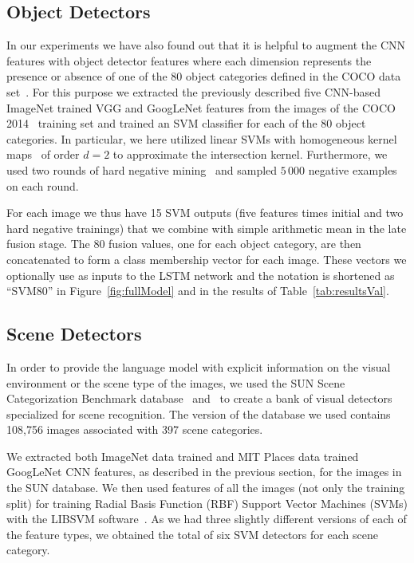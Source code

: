 \subsection{Object Detectors}
In our experiments we have also found out that it is helpful to
augment the CNN features with object detector features where each
dimension represents the presence or absence of one of the 80 object
categories defined in the COCO data set~\cite{Lin2014}.
For this purpose we extracted the previously described five CNN-based
ImageNet trained VGG and GoogLeNet features from the images of the
COCO 2014~\cite{Lin2014} training set and trained an SVM classifier
for each of the 80 object categories.
In particular, we here utilized linear SVMs with homogeneous kernel
maps~\cite{Vedaldi2010} of order $d=2$ to approximate the intersection
kernel.
Furthermore, we used two rounds of hard negative mining~\cite{Li2013}
and sampled $5\,000$ negative examples on each round.

For each image we thus have 15 SVM outputs (five features times
initial and two hard negative trainings) that we combine with simple
arithmetic mean in the late fusion stage.
The 80 fusion values, one for each object category, are then
concatenated to form a class membership vector for each image.
These vectors we optionally use as inputs to the LSTM network and the
notation is shortened as ``SVM80'' in Figure~\ref{fig:fullModel} and
in the results of Table~\ref{tab:resultsVal}.

\subsection{Scene Detectors}
In order to provide the language model with explicit information on the
visual environment or the scene type of the images, we used the SUN
Scene Categorization Benchmark database~\cite{Xiao2010}
and~\cite{Xiao2014} to create a bank of visual detectors specialized
for scene recognition.
The version of the database we used contains 108,756 images associated
with 397 scene categories.

We extracted both ImageNet data trained and MIT Places data trained
GoogLeNet CNN features, as described in the previous section, for the
images in the SUN database.
We then used features of all the images (not only the training split)
for training Radial Basis Function (RBF) Support Vector Machines
(SVMs) with the LIBSVM software~\cite{LIBSVM}.
As we had three slightly different versions of each of the feature
types, we obtained the total of six SVM detectors for each scene
category.

